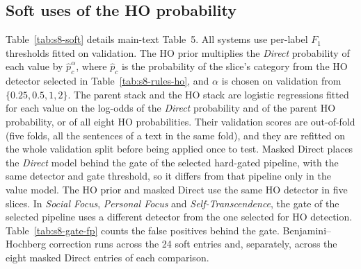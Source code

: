 \subsection{Soft uses of the HO probability}
\label{sec:s8-soft}

Table~\ref{tab:s8-soft} details main-text Table~5. All systems use per-label $F_1$ thresholds fitted on validation. The HO prior multiplies the \emph{Direct} probability of each value by $\hat{p}_c^{\alpha}$, where $\hat{p}_c$ is the probability of the slice's category from the HO detector selected in Table~\ref{tab:s8-rules-ho}, and $\alpha$ is chosen on validation from $\{0.25,0.5,1,2\}$. The parent stack and the HO stack are logistic regressions fitted for each value on the log-odds of the \emph{Direct} probability and of the parent HO probability, or of all eight HO probabilities. Their validation scores are out-of-fold (five folds, all the sentences of a text in the same fold), and they are refitted on the whole validation split before being applied once to test. Masked Direct places the \emph{Direct} model behind the gate of the selected hard-gated pipeline, with the same detector and gate threshold, so it differs from that pipeline only in the value model. The HO prior and masked Direct use the same HO detector in five slices. In \emph{Social Focus}, \emph{Personal Focus} and \emph{Self-Transcendence}, the gate of the selected pipeline uses a different detector from the one selected for HO detection. Table~\ref{tab:s8-gate-fp} counts the false positives behind the gate. Benjamini--Hochberg correction runs across the 24 soft entries and, separately, across the eight masked Direct entries of each comparison.

